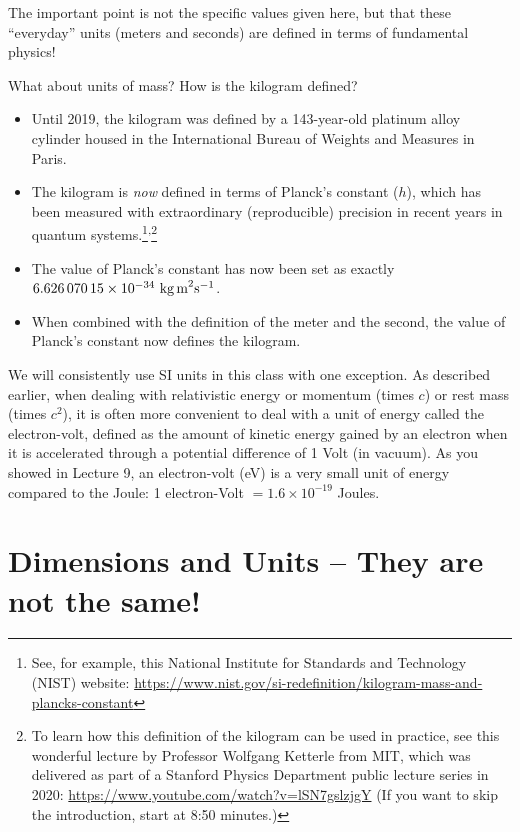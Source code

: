 \documentclass[11pt, letterpaper, openany]{book}
\begin{document}
The important point is not the specific values given here, but that these ``everyday'' units (meters and seconds) are defined in terms of fundamental physics!

What about units of mass? How is the kilogram defined?
\begin{itemize}
    \item Until 2019, the kilogram was defined by a 143-year-old platinum alloy cylinder housed in the International Bureau of Weights and Measures in Paris.
    \item The kilogram is \textit{now} defined in terms of Planck's constant ($h$), which has been measured with extraordinary (reproducible) precision in recent years in quantum systems.\footnote{See, for example, this National Institute for Standards and Technology (NIST) website: \url{https://www.nist.gov/si-redefinition/kilogram-mass-and-plancks-constant}}\textsuperscript{,}\footnote{To learn how this definition of the kilogram can be used in practice, see this wonderful lecture by Professor Wolfgang Ketterle from MIT, which was delivered as part of a Stanford Physics Department public lecture series in 2020: \url{https://www.youtube.com/watch?v=lSN7gslzjgY} (If you want to skip the introduction, start at 8:50 minutes.)}
    \item The value of Planck's constant has now been set as exactly $6.626\,070\,15 \times 10^{-34} \text{ kg\,m}^2\text{s}^{-1}$.
    \item When combined with the definition of the meter and the second, the value of Planck's constant now defines the kilogram.
\end{itemize}

We will consistently use SI units in this class with one exception. As described earlier, when dealing with relativistic energy or momentum (times $c$) or rest mass (times $c^2$), it is often more convenient to deal with a unit of energy called the electron-volt, defined as the amount of kinetic energy gained by an electron when it is accelerated through a potential difference of 1 Volt (in vacuum). As you showed in Lecture 9, an electron-volt (eV) is a very small unit of energy compared to the Joule: 1 electron-Volt $= 1.6 \times 10^{-19}$ Joules.

\section{Dimensions and Units -- They are not the same!}
\end{document}
